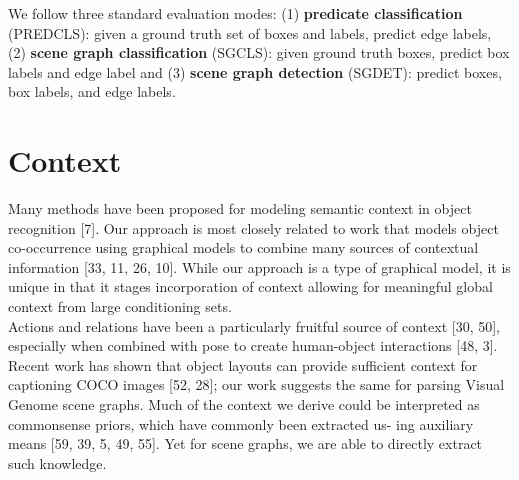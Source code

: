 We follow three standard evaluation modes: (1) \textbf{predicate classification} (PREDCLS): given a ground truth set of boxes and labels, predict edge labels, (2) \textbf{scene graph classification} (SGCLS): given ground truth boxes, predict box labels and edge label and (3) \textbf{scene graph detection} (SGDET): predict boxes, box labels, and edge labels.


\section{Context}
Many methods have been proposed for modeling semantic context in object recognition [7]. Our approach is most closely related to work that models object co-occurrence using graphical models to combine many sources of contextual information [33, 11, 26, 10]. While our approach is a type of graphical model, it is unique in that it stages incorporation of context allowing for meaningful global context from large conditioning sets.\\
Actions and relations have been a particularly fruitful source of context [30, 50], especially when combined with pose to create human-object interactions [48, 3]. Recent work has shown that object layouts can provide sufficient context for captioning COCO images [52, 28]; our work suggests the same for parsing Visual Genome scene graphs. Much of the context we derive could be interpreted as commonsense priors, which have commonly been extracted us- ing auxiliary means [59, 39, 5, 49, 55]. Yet for scene graphs, we are able to directly extract such knowledge.